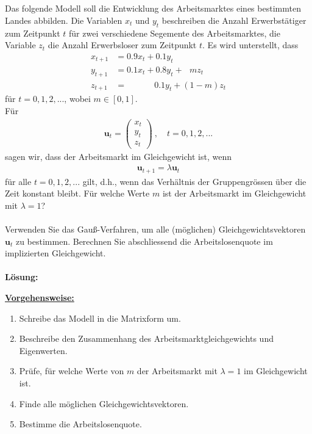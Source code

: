 \subsection*{}
Das folgende Modell soll die Entwicklung des Arbeitsmarktes eines bestimmten Landes abbilden.
Die Variablen $ x_t $ und $ y_t $ beschreiben die Anzahl Erwerbstätiger zum Zeitpunkt $ t $ für zwei verschiedene Segemente des Arbeitsmarktes, die Variable $ z_t $ die Anzahl Erwerbsloser zum Zeitpunkt $ t $.
Es wird unterstellt, dass
\begin{align*}
	x_{t+1} &= 0.9 x_t + 0.1 y_t\\
	y_{t+1} &= 0.1 x_t + 0.8 y_t + \ \ \  m z_t\\
	z_{t+1} &= \qquad \quad  \  0.1 y_t +(1-m) z_t 
\end{align*}
für $ t = 0,1,2,... $, wobei $ m \in [0,1] $.\\
Für 
\begin{align*}
	\textbf{u}_t = \begin{pmatrix}
		x_t \\ y_t \\ z_t
	\end{pmatrix} \ , \quad
	t = 0,1,2,...
\end{align*}
sagen wir, dass der Arbeitsmarkt im Gleichgewicht ist, wenn 
\begin{align*}
	\textbf{u}_{t+1} = \lambda \textbf{u}_t
\end{align*}
für alle $ t = 0,1,2,... $ gilt, d.h., wenn das Verhältnis der Gruppengrössen über die Zeit konstant bleibt. 
Für welche Werte $ m $ ist der Arbeitsmarkt im Gleichgewicht mit $ \lambda = 1 $?\\
\\
Verwenden Sie das Gauß-Verfahren, um alle (möglichen) Gleichgewichtsvektoren $ \textbf{u}_t $ zu bestimmen. Berechnen Sie abschliessend die Arbeitslosenquote im implizierten Gleichgewicht.
\\ \\
\textbf{Lösung:}
\begin{mdframed}
\underline{\textbf{Vorgehensweise:}}
\renewcommand{\labelenumi}{\theenumi.}
\begin{enumerate}
\item Schreibe das Modell in die Matrixform um.
\item Beschreibe den Zusammenhang des Arbeitsmarktgleichgewichts und Eigenwerten.
\item Prüfe, für welche Werte von $ m $ der Arbeitsmarkt mit $ \lambda = 1 $ im Gleichgewicht ist.
\item Finde alle möglichen Gleichgewichtsvektoren.
\item Bestimme die Arbeitslosenquote.
\end{enumerate}
\end{mdframed}

